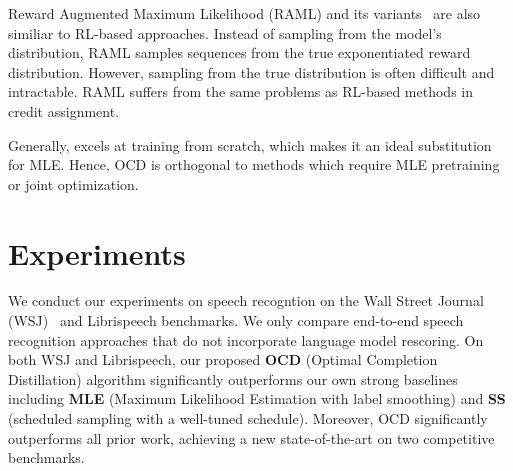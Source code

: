 Reward Augmented Maximum Likelihood (RAML) \citep{norouzi-nips-2016} and its variants~\citep{ma2017softmax,elbayad2018token,wang2018switchout} are also similiar
to RL-based approaches. Instead of sampling from the model's distribution, RAML samples sequences from the true exponentiated reward distribution.
However, sampling from the true distribution is often difficult and intractable. RAML suffers from the same problems as RL-based methods in credit assignment. 

Generally, \acronym excels at training from scratch, which makes it an ideal substitution for MLE. Hence, OCD is orthogonal to methods which require
MLE pretraining or joint optimization.
\section{Experiments}
\label{sec:experiments}

We conduct our experiments on speech recogntion on the Wall Street Journal (WSJ)~\citep{paul1992design} and Librispeech \citep{librispeech}
benchmarks. We only compare end-to-end speech recognition approaches that do not incorporate language model rescoring.
On both WSJ and Librispeech, our proposed {\bf OCD} (Optimal Completion Distillation) algorithm significantly outperforms our own strong baselines
including {\bf MLE} (Maximum Likelihood Estimation with label smoothing) and {\bf SS} (scheduled sampling with a well-tuned schedule).
Moreover, OCD significantly outperforms all prior work, achieving a new state-of-the-art on two competitive benchmarks.
